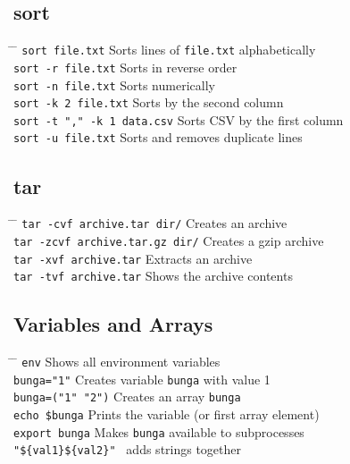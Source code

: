 \documentclass[a4paper,10pt]{article}
\begin{document}
\subsection{sort}
\begin{tabbing}
	\= \hspace{60mm} \= \hspace{80mm} \kill
	\> \verb|sort file.txt| \> Sorts lines of \verb|file.txt| alphabetically \\
	\> \verb|sort -r file.txt| \> Sorts in reverse order \\
	\> \verb|sort -n file.txt| \> Sorts numerically \\
	\> \verb|sort -k 2 file.txt| \> Sorts by the second column \\
	\> \verb|sort -t "," -k 1 data.csv| \> Sorts CSV by the first column \\
	\> \verb|sort -u file.txt| \> Sorts and removes duplicate lines \\
\end{tabbing}

\subsection{tar}
\begin{tabbing}
	\= \hspace{30mm} \= \hspace{50mm} \kill
	\> \verb|tar -cvf archive.tar dir/| \> Creates an archive \\
	\> \verb|tar -zcvf archive.tar.gz dir/| \> Creates a gzip archive \\
	\> \verb|tar -xvf archive.tar| \> Extracts an archive \\
	\> \verb|tar -tvf archive.tar| \> Shows the archive contents \\
\end{tabbing}

\subsection{Variables and Arrays}
\begin{tabbing}
	\= \hspace{30mm} \= \hspace{50mm} \kill
	\> \verb|env| \> Shows all environment variables \\
	\> \verb|bunga="1"| \> Creates variable \verb|bunga| with value 1 \\
	\> \verb|bunga=("1" "2")| \> Creates an array \verb|bunga| \\
	\> \verb|echo $bunga| \> Prints the variable (or first array element) \\
	\> \verb|export bunga| \> Makes \verb|bunga| available to subprocesses \\
	\> \verb|"${val1}${val2}" | \> adds strings together \\
\end{tabbing}
\end{document}
